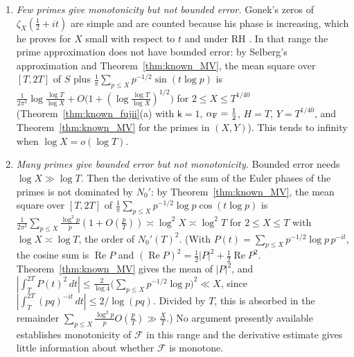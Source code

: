 \documentclass[11pt,a4paper]{article}
\makeatletter
\numberwithin{equation}{section}
\DeclareRobustCommand{\CGref}[1]{\ref{#1}}
\DeclareRobustCommand{\CGcite}[2][]{\if\relax\detokenize{#1}\relax\cite{#2}\else\cite[#1]{#2}\fi}
\let\CG@origref\ref
\newcommand{\CG@gettip}[1]{\@ifundefined{CGTip@#1}{#1}{\csname CGTip@#1\endcsname}}
\newcommand{\CG@getbib}[1]{\@ifundefined{CGBib@#1}{#1}{\csname CGBib@#1\endcsname}}
\DeclareRobustCommand{\CGref}[1]{\pdftooltip{\CG@origref{#1}}{\CG@gettip{#1}}}
\DeclareRobustCommand{\CGcite}[2][]{\pdftooltip{\if\relax\detokenize{#1}\relax\cite{#2}\else\cite[#1]{#2}\fi}{\CG@getbib{#2}}}
\theoremstyle{definition}
\theoremstyle{remark}
\newcommand{\Nz}{N_0} %
\newcommand{\Fc}{\mathcal F}
\makeatother
\begin{document}
\begin{enumerate}
\item \emph{Few primes give monotonicity but not bounded error.} Gonek's zeros of $\zeta_X(\frac12+it)$ are simple and are counted because his phase is increasing, which he proves for $X$ small with respect to $t$ and under RH \CGcite[Thm.~8.1 and \S10]{Gonek2012}. In that range the prime approximation does not have bounded error: by Selberg's approximation \CGcite[\S3]{Fujii1974} and Theorem~\CGref{thm:known_MV}, the mean square over $[T,2T]$ of $S$ plus $\frac1\pi\sum_{p\le X}p^{-1/2}\sin(t\log p)$ is $\frac1{2\pi^2}\log\frac{\log T}{\log X}+O\bigl(1+(\log\frac{\log T}{\log X})^{1/2}\bigr)$ for $2\le X\le T^{1/40}$ (Theorem~\CGref{thm:known_fujii}(a) with $\mathsf k=1$, $\alpha_{\rm F}=\frac12$, $H=T$, $Y=T^{1/40}$, and Theorem~\CGref{thm:known_MV} for the primes in $(X,Y)$). This tends to infinity when $\log X=o(\log T)$.
\item \emph{Many primes give bounded error but not monotonicity.} Bounded error needs $\log X\gg\log T$. Then the derivative of the sum of the Euler phases of the primes is not dominated by $\Nz'$: by Theorem~\CGref{thm:known_MV}, the mean square over $[T,2T]$ of $\frac1\pi\sum_{p\le X}p^{-1/2}\log p\cos(t\log p)$ is $\frac{1}{2\pi^2}\sum_{p\le X}\frac{\log^2p}{p}(1+O(\frac{p}{T}))\asymp\log^2X\asymp\log^2T$ for $2\le X\le T$ with $\log X\asymp\log T$, the order of $\Nz'(T)^2$. (With $P(t)=\sum_{p\le X}p^{-1/2}\log p\,p^{-it}$, the cosine sum is $\operatorname{Re}P$ and $(\operatorname{Re}P)^2=\frac12|P|^2+\frac12\operatorname{Re}P^2$. Theorem~\CGref{thm:known_MV} gives the mean of $|P|^2$, and $|\int_T^{2T}P(t)^2\,dt|\le\frac2{\log4}\bigl(\sum_{p\le X}p^{-1/2}\log p\bigr)^2\ll X$, since $|\int_T^{2T}(pq)^{-it}\,dt|\le2/\log(pq)$. Divided by $T$, this is absorbed in the remainder $\sum_{p\le X}\frac{\log^2p}{p}O(\frac pT)\gg\frac XT$.) No argument presently available establishes monotonicity of $\Fc$ in this range and the derivative estimate gives little information about whether $\Fc$ is monotone.
\end{enumerate}
\end{document}
